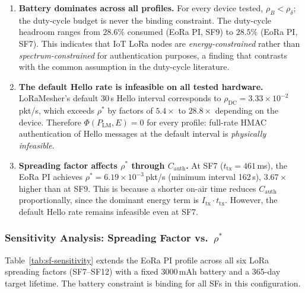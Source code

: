 \begin{enumerate}[label=(\roman*)]
  \item \textbf{Battery dominates across all profiles.}
        For every device tested, $\rho_B < \rho_\delta$; the duty-cycle
        budget is never the binding constraint.  The duty-cycle headroom
        ranges from $28.6\%$ consumed (EoRa PI, SF9) to $28.5\%$ (EoRa PI,
        SF7).  This indicates that IoT LoRa nodes are
        \emph{energy-constrained} rather than \emph{spectrum-constrained}
        for authentication purposes, a finding that contrasts with the
        common assumption in the duty-cycle literature.

  \item \textbf{The default Hello rate is infeasible on all tested hardware.}
        LoRaMesher's default 30\,s Hello interval corresponds to
        $\rho_{\mathrm{DC}} = 3.33 \times 10^{-2}$\,pkt/s, which exceeds
        $\rho^*$ by factors of $5.4 \times$ to $28.8 \times$ depending on
        the device.  Therefore $\Phi(P_{\mathrm{LM}}, E) = 0$ for every
        profile: full-rate HMAC authentication of Hello messages at the
        default interval is \emph{physically infeasible}.

  \item \textbf{Spreading factor affects $\rho^*$ through $C_{\mathrm{auth}}$.}
        At SF7 ($t_{\mathrm{tx}} = 461$\,ms), the EoRa PI achieves
        $\rho^* = 6.19 \times 10^{-3}$\,pkt/s (minimum interval 162\,s),
        $3.67 \times$ higher than at SF9.  This is because a shorter
        on-air time reduces $C_{\mathrm{auth}}$ proportionally, since the
        dominant energy term is $I_{\mathrm{tx}} \cdot t_{\mathrm{tx}}$.
        However, the default Hello rate remains infeasible even at SF7.
\end{enumerate}

\subsubsection{Sensitivity Analysis: Spreading Factor vs.\ $\rho^*$}
\label{subsubsec:sf-sensitivity}

Table~\ref{tab:sf-sensitivity} extends the EoRa PI profile across all six
LoRa spreading factors (SF7--SF12) with a fixed 3000\,mAh battery and a
365-day target lifetime.  The battery constraint is binding for all SFs in
this configuration.

